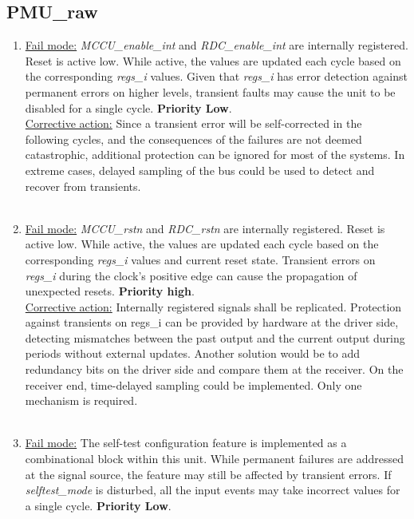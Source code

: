 \subsection{PMU\_raw}
\begin{enumerate}
\item \underline{Fail mode:} \textit{MCCU\_enable\_int} and \textit{RDC\_enable\_int} are internally registered. Reset is active low. While active, the values are updated each cycle based on the corresponding \textit{regs\_i} values. Given that \textit{regs\_i} has error detection against permanent errors on higher levels, transient faults may cause the unit to be disabled for a single cycle. \textbf{Priority Low}.\\
\underline{Corrective action:} Since a transient error will be self-corrected in the following cycles, and the consequences of the failures are not deemed catastrophic, additional protection can be ignored for most of the systems. In extreme cases, delayed sampling of the bus could be used to detect and recover from transients.\\
\\
\item \underline{Fail mode:} \textit{MCCU\_rstn} and \textit{RDC\_rstn} are internally registered. Reset is active low. While active, the values are updated each cycle based on the corresponding \textit{regs\_i} values and current reset state. Transient errors on \textit{regs\_i} during the clock's positive edge can cause the propagation of unexpected resets. \textbf{Priority high}.\\
\underline{Corrective action:} 
Internally registered signals shall be replicated. Protection against transients on regs\_i can be provided by hardware at the driver side, detecting mismatches between the past output and the current output during periods without external updates. Another solution would be to add redundancy bits on the driver side and compare them at the receiver. On the receiver end, time-delayed sampling could be implemented. Only one mechanism is required.\\ 
\\
\item \underline{Fail mode:} The self-test configuration feature is implemented as a combinational block within this unit. While permanent failures are addressed at the signal source, the feature may still be affected by transient errors. If \textit{selftest\_mode} is disturbed, all the input events may take incorrect values for a single cycle. \textbf{Priority Low}.\\

\end{enumerate}
